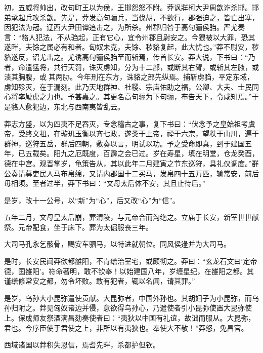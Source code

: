 \documentclass[12pt,UTF8]{ctexbook}
\begin{document}
初，五威将帅出，改句町王以为侯，王邯怨怒不附。莽讽牂柯大尹周歆诈杀邯。邯弟承起兵攻杀歆。先是，莽发高句骊兵，当伐胡，不欲行，郡强迫之，皆亡出塞，因犯法为冠。辽西大尹田谭追击之，为所杀。州郡归咎于高句骊侯驺。严尤奏言：“貉人犯法，不从驺起，正有它心，宜令州郡且尉安之。今猥被以大罪，恐其遂畔，夫馀之属必有和者。匈奴未克，夫馀、秽貉复起，此大忧也。”莽不尉安，秽貉遂反，诏尤击之。尤诱高句骊侯驺至而斩焉，传首长安。莽大说，下书曰：“乃者，命遣猛将，共行天罚，诛灭虏知，分为十二部，或断其右臂，或斩其左腋，或溃其胸腹，或其两胁。今年刑在东方，诛貉之部先纵焉。捕斩虏驺，平定东域，虏知殄灭，在于漏刻。此乃天地群神、社稷、宗庙佑助之福，公卿、大夫、士民同心将率虓虎之力也。予甚嘉之。其更名高句骊为下句骊，布告天下，令咸知焉。”于是貉人愈犯边，东北与西南夷皆乱云。



莽志方盛，以为四夷不足吞灭，专念稽古之事，复下书曰：“伏念予之皇始祖考虞帝，受终文祖，在璇玑玉衡以齐七政，遂类于上帝，禋于六宗，望秩于山川，遍于群神，巡狩五岳，群后四朝，敷奏以言，明试以功。予之受命即真，到于建国五年，已五载矣。阳九之厄既度，百霹之会已过。岁在寿星，填在明堂，仓龙癸酉，德在中宫。观晋掌岁，龟策告从，其以此年二月建寅之节东巡狩，具礼仪调度。”群公奏请募吏民人马布帛绵，又请内郡国十二买马，发帛四十五万匹，输常安，前后毋相须。至者过半，莽下书曰：“文母太后体不安，其且止待后。”



是岁，改十一公号，以“新”为“心”，后又改“心”为“信”。



五年二月，文母皇太后崩，葬渭陵，与元帝合而沟绝之。立庙于长安，新室世世献祭。元帝配食，坐于床下。葬为太倔服丧三年。



大司马孔永乞骸骨，赐安车驷马，以特进就朝位。同风侯逯并为大司马。



是时，长安民闻莽欲都雒阳，不肯缮治室宅，或颇彻之。莽曰：“玄龙石文曰‘定帝德，国雒阳’。符命著明，敢不钦奉！以始建国八年，岁缠星纪，在雒阳之都。其谨缮修常安之都，勿令坏败。敢有犯者，辄以名闻，请其罪。”



是岁，乌孙大小昆弥遣使贡献。大昆弥者，中国外孙也。其胡妇子为小昆弥，而乌孙归附之。莽见匈奴诸边并侵，意欲得乌孙心，乃遣使者引小昆弥使置大昆弥使上。保成师友祭酒满昌劾奏使者曰：“夷狄以中国有礼谊，故诎而服从。大昆弥，君也。今序臣使于君使之上，非所以有夷狄也。奉使大不敬！”莽怒，免昌官。



西域诸国以莽积失恩信，焉耆先畔，杀都护但钦。
\end{document}
